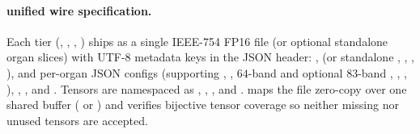 \paragraph{ unified  wire specification.}
{\raggedright
Each \sone{} tier (, , , ) ships as a single IEEE-754 FP16  file (or optional standalone organ slices) with UTF-8 metadata keys in the  JSON header: ,  (or standalone , , , ), and per-organ JSON configs  (supporting , , $64$-band  and optional $83$-band , , , ), , , and . Tensors are namespaced as , , , and .  maps the file zero-copy over one shared buffer ( or ) and verifies bijective tensor coverage so neither missing nor unused tensors are accepted.\par}
